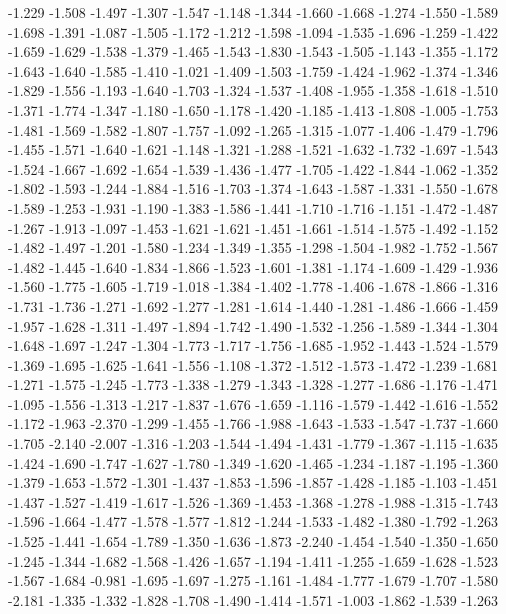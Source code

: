 \documentclass[9pt]{article}
\theoremstyle{plain}
\theoremstyle{definition}
\theoremstyle{remark}
\numberwithin{equation}{section}
\begin{document}
-1.229
-1.508
-1.497
-1.307
-1.547
-1.148
-1.344
-1.660
-1.668
-1.274
-1.550
-1.589
-1.698
-1.391
-1.087
-1.505
-1.172
-1.212
-1.598
-1.094
-1.535
-1.696
-1.259
-1.422
-1.659
-1.629
-1.538
-1.379
-1.465
-1.543
-1.830
-1.543
-1.505
-1.143
-1.355
-1.172
-1.643
-1.640
-1.585
-1.410
-1.021
-1.409
-1.503
-1.759
-1.424
-1.962
-1.374
-1.346
-1.829
-1.556
-1.193
-1.640
-1.703
-1.324
-1.537
-1.408
-1.955
-1.358
-1.618
-1.510
-1.371
-1.774
-1.347
-1.180
-1.650
-1.178
-1.420
-1.185
-1.413
-1.808
-1.005
-1.753
-1.481
-1.569
-1.582
-1.807
-1.757
-1.092
-1.265
-1.315
-1.077
-1.406
-1.479
-1.796
-1.455
-1.571
-1.640
-1.621
-1.148
-1.321
-1.288
-1.521
-1.632
-1.732
-1.697
-1.543
-1.524
-1.667
-1.692
-1.654
-1.539
-1.436
-1.477
-1.705
-1.422
-1.844
-1.062
-1.352
-1.802
-1.593
-1.244
-1.884
-1.516
-1.703
-1.374
-1.643
-1.587
-1.331
-1.550
-1.678
-1.589
-1.253
-1.931
-1.190
-1.383
-1.586
-1.441
-1.710
-1.716
-1.151
-1.472
-1.487
-1.267
-1.913
-1.097
-1.453
-1.621
-1.621
-1.451
-1.661
-1.514
-1.575
-1.492
-1.152
-1.482
-1.497
-1.201
-1.580
-1.234
-1.349
-1.355
-1.298
-1.504
-1.982
-1.752
-1.567
-1.482
-1.445
-1.640
-1.834
-1.866
-1.523
-1.601
-1.381
-1.174
-1.609
-1.429
-1.936
-1.560
-1.775
-1.605
-1.719
-1.018
-1.384
-1.402
-1.778
-1.406
-1.678
-1.866
-1.316
-1.731
-1.736
-1.271
-1.692
-1.277
-1.281
-1.614
-1.440
-1.281
-1.486
-1.666
-1.459
-1.957
-1.628
-1.311
-1.497
-1.894
-1.742
-1.490
-1.532
-1.256
-1.589
-1.344
-1.304
-1.648
-1.697
-1.247
-1.304
-1.773
-1.717
-1.756
-1.685
-1.952
-1.443
-1.524
-1.579
-1.369
-1.695
-1.625
-1.641
-1.556
-1.108
-1.372
-1.512
-1.573
-1.472
-1.239
-1.681
-1.271
-1.575
-1.245
-1.773
-1.338
-1.279
-1.343
-1.328
-1.277
-1.686
-1.176
-1.471
-1.095
-1.556
-1.313
-1.217
-1.837
-1.676
-1.659
-1.116
-1.579
-1.442
-1.616
-1.552
-1.172
-1.963
-2.370
-1.299
-1.455
-1.766
-1.988
-1.643
-1.533
-1.547
-1.737
-1.660
-1.705
-2.140
-2.007
-1.316
-1.203
-1.544
-1.494
-1.431
-1.779
-1.367
-1.115
-1.635
-1.424
-1.690
-1.747
-1.627
-1.780
-1.349
-1.620
-1.465
-1.234
-1.187
-1.195
-1.360
-1.379
-1.653
-1.572
-1.301
-1.437
-1.853
-1.596
-1.857
-1.428
-1.185
-1.103
-1.451
-1.437
-1.527
-1.419
-1.617
-1.526
-1.369
-1.453
-1.368
-1.278
-1.988
-1.315
-1.743
-1.596
-1.664
-1.477
-1.578
-1.577
-1.812
-1.244
-1.533
-1.482
-1.380
-1.792
-1.263
-1.525
-1.441
-1.654
-1.789
-1.350
-1.636
-1.873
-2.240
-1.454
-1.540
-1.350
-1.650
-1.245
-1.344
-1.682
-1.568
-1.426
-1.657
-1.194
-1.411
-1.255
-1.659
-1.628
-1.523
-1.567
-1.684
-0.981
-1.695
-1.697
-1.275
-1.161
-1.484
-1.777
-1.679
-1.707
-1.580
-2.181
-1.335
-1.332
-1.828
-1.708
-1.490
-1.414
-1.571
-1.003
-1.862
-1.539
-1.263
\end{document}
